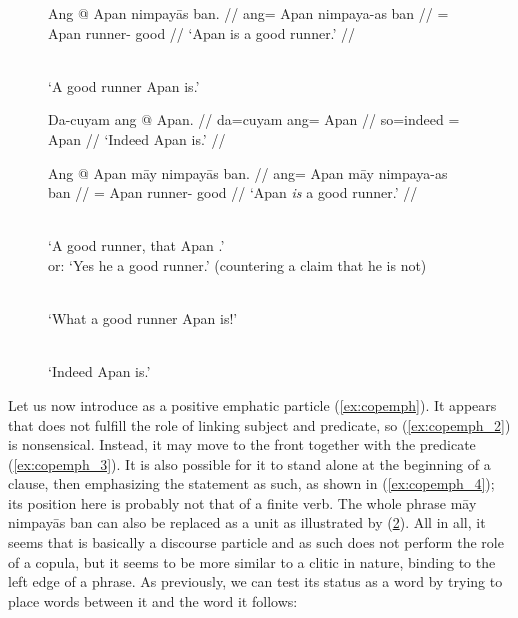 \begin{figure}
\pex\label{ex:copnoemph}
\a\label{ex:copnoemph_1}\begingl
	\gla Ang @ Apan nimpayās ban. //
	\glb ang= Apan nimpaya-as ban //
	\glc \Aarg{}= Apan runner-\Parg{} good //
	\glft `Apan is a good runner.' //
\endgl

\a\label{ex:copnoemph_2}%
	 \\
	`A good runner Apan is.'

\a\label{ex:copnoemph_3}\begingl
	\gla Da-cuyam ang @ Apan. //
	\glb da=cuyam ang= Apan //
	\glc so=indeed \Aarg{}= Apan //
	\glft `Indeed Apan is.' //
\endgl
\xe
\end{figure}

\begin{figure}
\pex\label{ex:copemph}
\a\label{ex:copemph_1}\begingl
	\gla Ang @ Apan māy nimpayās ban. //
	\glb ang= Apan māy nimpaya-as ban //
	\glc \Aarg{}= Apan \Int{} runner-\Parg{} good //
	\glft `Apan \emph{is} a good runner.' //
\endgl

\a\label{ex:copemph_2}%
	\ljudge*{}

\a\label{ex:copemph_3}%
	 \\
	`A good runner, that Apan .'\\
	or: `Yes he  a good runner.' (countering a claim that he is not)

\a\label{ex:copemph_4}%
	 \\
	`What a good runner Apan is!'

\a\label{ex:copemph_5}%
	 \\
	`Indeed Apan is.'
\xe
\end{figure}

Let us now introduce  as a positive emphatic particle
(\ref{ex:copemph}). It appears that  does not fulfill the role
of linking subject and predicate, so (\ref{ex:copemph_2}) is nonsensical.
Instead, it may move to the front together with the predicate
(\ref{ex:copemph_3}). It is also possible for it to stand alone at the
beginning of a clause, then emphasizing the statement as such, as shown in
(\ref{ex:copemph_4}); its position here is probably not that of a finite verb.
The whole phrase  {māy nimpayās ban} can also be
replaced as a unit as illustrated by (\ref{ex:copemph_5}). All in all, it seems
that  is basically a discourse particle and as such does not
perform the role of a copula, but it seems to be more similar to a clitic in
nature, binding to the left edge of a phrase. As previously, we can test its
status as a word by trying to place words between it and the word it follows:


